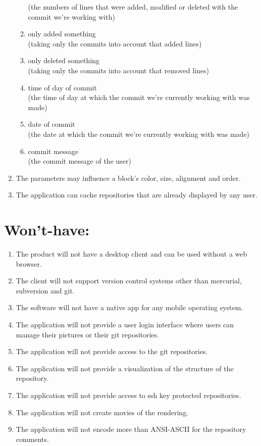 \documentclass[12pt]{scrartcl}
\begin{document}
\begin{enumerate}
\begin{enumerate}
(the numbers of lines that were added, modified or deleted with the commit we're working with)
\item only added something \\
(taking only the commits into account that added lines)
\item only deleted something\\
(taking only the commits into account that removed lines)
\item time of day of commit\\
(the time of day at which the commit we're currently working with was made)
\item date of commit\\
(the date at which the commit we're currently working with was made)
\item commit message\\
(the commit message of the user)
\end{enumerate}
\item The parameters may influence a block's color, size, alignment and order.
\item The application can cache repositories that are already displayed by any user.
\end{enumerate}
\section{Won't-have:}
\begin{enumerate}
\item The product will not have a desktop client and can be used without a web browser.
\item The client will not support version control systems other than mercurial, subversion and git.
\item The software will not have a native app for any mobile operating system.
\item The application will not provide a user login interface where users can manage their pictures or their git repositories.
\item The application will not provide access to the git repositories.
\item The application will not provide a visualization of the structure of the repository.
\item The application will not provide access to ssh key protected repositories.
\item The application will not create movies of the rendering.
\item The application will not encode more than ANSI-ASCII for the repository comments.
\end{enumerate}
\end{document}
